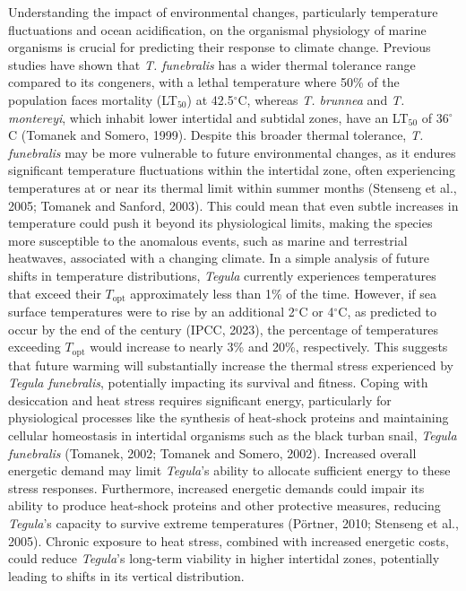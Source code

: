\documentclass{CSUNthesis}
\begin{document}
Understanding the impact of environmental changes, particularly temperature fluctuations and ocean acidification, on the organismal physiology of marine organisms is crucial for predicting their response to climate change. Previous studies have shown that \textit{T. funebralis} has a wider thermal tolerance range compared to its congeners, with a lethal temperature where 50\% of the population faces mortality (LT\(_{50}\)) at 42.5\(^\circ\)C, whereas \textit{T. brunnea} and \textit{T. montereyi}, which inhabit lower intertidal and subtidal zones, have an LT\(_{50}\) of 36\(^\circ\)C (Tomanek and Somero, 1999). Despite this broader thermal tolerance, \textit{T. funebralis} may be more vulnerable to future environmental changes, as it endures significant temperature fluctuations within the intertidal zone, often experiencing temperatures at or near its thermal limit within summer months (Stenseng et al., 2005; Tomanek and Sanford, 2003). This could mean that even subtle increases in temperature could push it beyond its physiological limits, making the species more susceptible to the anomalous events, such as marine and terrestrial heatwaves, associated with a changing climate. In a simple analysis of future shifts in temperature distributions, \textit{Tegula} currently experiences temperatures that exceed their \(T_{\text{opt}}\) approximately less than 1\% of the time. However, if sea surface temperatures were to rise by an additional 2\(^\circ\)C or 4\(^\circ\)C, as predicted to occur by the end of the century (IPCC, 2023), the percentage of temperatures exceeding \(T_{\text{opt}}\) would increase to nearly 3\% and 20\%, respectively. This suggests that future warming will substantially increase the thermal stress experienced by \textit{Tegula funebralis}, potentially impacting its survival and fitness. Coping with desiccation and heat stress requires significant energy, particularly for physiological processes like the synthesis of heat-shock proteins and maintaining cellular homeostasis in intertidal organisms such as the black turban snail, \textit{Tegula funebralis} (Tomanek, 2002; Tomanek and Somero, 2002). Increased overall energetic demand may limit \textit{Tegula}'s ability to allocate sufficient energy to these stress responses. Furthermore, increased energetic demands could impair its ability to produce heat-shock proteins and other protective measures, reducing \textit{Tegula}'s capacity to survive extreme temperatures (Pörtner, 2010; Stenseng et al., 2005). Chronic exposure to heat stress, combined with increased energetic costs, could reduce \textit{Tegula}'s long-term viability in higher intertidal zones, potentially leading to shifts in its vertical distribution.
\end{document}
